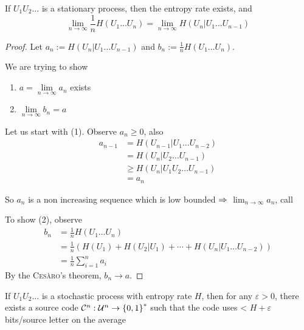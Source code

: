 \begin{theorem}
    If $U_1U_2\ldots$ is a stationary process, then the entropy rate exists, and
    \[
        \lim\limits_{n\to\infty} \frac{1}{n} H(U_1\ldots U_n) = \lim\limits_{n\to\infty} H(U_n \vert U_1\ldots U_{n-1})
    \]
\end{theorem}
\begin{proof}
    Let $a_n := H(U_n \vert U_1 \ldots U_{n-1})$ and $b_n := \frac{1}{n} H(U_1 \ldots U_n)$.
    
    We are trying to show
    \begin{enumerate}
        \item $a = \lim\limits_{n\to\infty} a_n$ exists
        \item $\lim\limits_{n\to\infty} b_n = a$
    \end{enumerate}
    
    Let us start with (1). Observe $a_n \geqslant 0$, also
    \[
        \begin{aligned}
            a_{n-1} &= H(U_{n-1} \vert U_1 \ldots U_{n-2})\\
            &= H(U_n \vert U_2 \ldots U_{n-1})\\
            &\geqslant H(U_n \vert U_1 U_2\ldots U_{n-1})\\
            &= a_n
        \end{aligned}            
    \]
    
    So $a_n$ is a non increasing sequence which is low bounded $\Rightarrow$ $\lim_{n\to\infty} a_n$, call
    
    To show (2), observe
    \[
        \begin{aligned}
            b_n &= \frac{1}{n} H(U_1\ldots U_n)\\
            &= \frac{1}{n} \left( H(U_1)+H(U_2 \vert U_1) + \cdots + H(U_n \vert U_1\ldots U_{n-2}) \right)\\
            &= \frac{1}{n} \sum\limits_{i=1}^n a_i
        \end{aligned}
    \]
    By the \textsc{Cesàro}'s theorem, $b_n\to a$.
\end{proof}

\begin{theorem}
    If $U_1U_2\ldots$ is a stochastic process with entropy rate $H$, then for any $\varepsilon > 0$, there exists a source code $\mathcal{C}^n : \mathcal{U}^n \to \left\{ 0,1 \right\}^*$ such that the code uses < $H + \varepsilon$ bits/source letter on the average
\end{theorem}